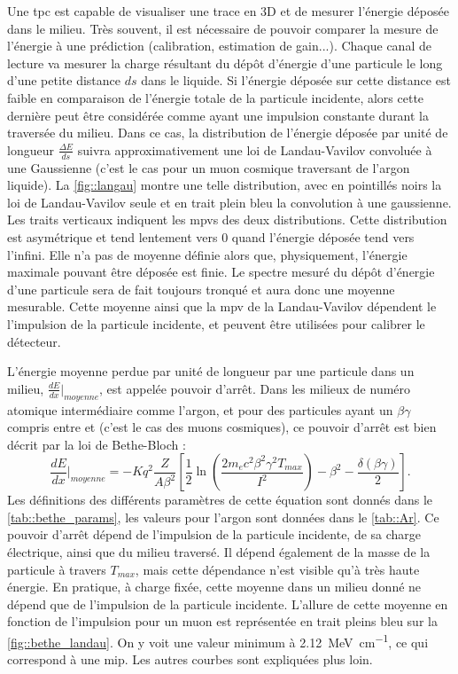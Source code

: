         Une \gls{tpc} est capable de visualiser une trace en 3D et de mesurer l'énergie déposée dans le milieu. Très souvent, il est nécessaire de pouvoir comparer la mesure de l'énergie à une prédiction (calibration, estimation de gain...). Chaque canal de lecture va mesurer la charge résultant du dépôt d'énergie d'une particule le long d'une petite distance $ds$ dans le liquide. Si l'énergie déposée sur cette distance est faible en comparaison de l'énergie totale de la particule incidente, alors cette dernière peut être considérée comme ayant une impulsion constante durant la traversée du milieu. Dans ce cas, la distribution de l'énergie déposée par unité de longueur $\frac{\Delta E}{ds}$ suivra approximativement une loi de Landau-Vavilov convoluée à une Gaussienne\cite{Bichsel2006} (c'est le cas pour un muon cosmique traversant de l'argon liquide). La \autoref{fig::langau} montre une telle distribution, avec en pointillés noirs la loi de Landau-Vavilov seule et en trait plein bleu la convolution à une gaussienne. Les traits verticaux indiquent les \glspl{mpv} des deux distributions. Cette distribution est asymétrique et tend lentement vers $0$ quand l'énergie déposée tend vers l'infini. Elle n'a pas de moyenne définie alors que, physiquement, l'énergie maximale pouvant être déposée est finie. Le spectre mesuré du dépôt d'énergie d'une particule sera de fait toujours tronqué et aura donc une moyenne mesurable. Cette moyenne ainsi que la \gls{mpv} de la Landau-Vavilov dépendent le l'impulsion de la particule incidente, et peuvent être utilisées pour calibrer le détecteur.

        L'énergie moyenne perdue par unité de longueur par une particule dans un milieu, $\frac{dE}{dx}\rvert_{moyenne}$, est appelée pouvoir d'arrêt. Dans les milieux de numéro atomique intermédiaire comme l'argon, et pour des particules ayant un $\beta\gamma$ compris entre  et  (c'est le cas des muons cosmiques), ce pouvoir d'arrêt est bien décrit par la loi de Bethe-Bloch\cite{pdg2018} :
        \begin{equation}\label{eq::bethe_bloch}
          \frac{dE}{dx}\biggr\rvert_{moyenne} = -Kq^2 \frac{Z}{A\beta^2}\left[\frac{1}{2}\ln\left(\frac{2m_ec^2\beta^2\gamma^2T_{max}}{I^2}\right)-\beta^2-\frac{\delta(\beta\gamma)}{2} \right].
        \end{equation}
        Les définitions des différents paramètres de cette équation sont donnés dans le \autoref{tab::bethe_params}, les valeurs pour l'argon sont données dans le \autoref{tab::Ar}. Ce pouvoir d'arrêt dépend de l'impulsion de la particule incidente, de sa charge électrique, ainsi que du milieu traversé. Il dépend également de la masse de la particule à travers $T_{max}$, mais cette dépendance n'est visible qu'à très haute énergie\cite{pdg2018}. En pratique, à charge fixée, cette moyenne dans un milieu donné ne dépend que de l'impulsion de la particule incidente. L'allure de cette moyenne en fonction de l'impulsion pour un muon est représentée en trait pleins bleu sur la \autoref{fig::bethe_landau}. On y voit une valeur minimum à \SI{2.12}{\mega\electronvolt\per\centi\meter}, ce qui correspond à une \gls{mip}. Les autres courbes sont expliquées plus loin.


